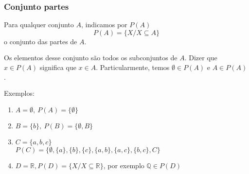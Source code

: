 \subsubsection{Conjunto partes}

\begin{definicao} Para qualquer conjunto $A$, indicamos por $P(A)$\[P(A)=\{X/X\subseteq A\}\] o conjunto das partes de $A$.\end{definicao}

Os elementos desse conjunto s{\~a}o todos os subconjuntos de $A$. Dizer que $x\in P(A)$ significa que $x\in A$. Particularmente, temos $\emptyset\in P(A)$ e $A\in P(A)$.

Exemplos:
\begin{enumerate}
\item $A=\emptyset,\ P(A)=\{\emptyset\}$
\item $B=\{b\},\ P(B)=\{\emptyset,B\}$
\item $C=\{a,b,c\}$\\
$P(C)=\{\emptyset, \{a\}, \{b\},\{c\},\{a,b\},\{a,c\},\{b,c\},C\}$
\item $D=\mathbb{R},P(D)=\{X/X\subseteq\mathbb{R}\}$, por exemplo $\mathbb{Q}\in P(D)$
\end{enumerate}